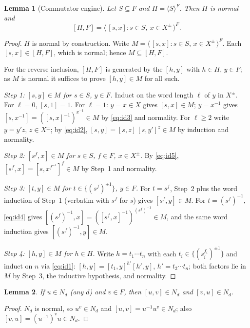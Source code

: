 \documentclass{amsart}
\newtheorem{lemma}{Lemma}
\theoremstyle{definition}
\theoremstyle{remark}
\begin{document}
\begin{lemma}[Commutator engine]\label{lem:engine}
Let $S\subseteq F$ and $H=\langle S\rangle^{F}$. Then $H$ is normal and
\begin{equation}\label{eq:engine}
[H,F]=\big\langle\,[s,x] : s\in S,\ x\in X^{\pm}\,\big\rangle^{F}.
\end{equation}
\end{lemma}
\begin{proof}
$H$ is normal by construction. Write
$M=\langle\,[s,x]:s\in S,\,x\in X^{\pm}\,\rangle^{F}$. Each $[s,x]\in[H,F]$, which is
normal; hence $M\subseteq[H,F]$.

For the reverse inclusion, $[H,F]$ is generated by the $[h,y]$ with $h\in H$,
$y\in F$; as $M$ is normal it suffices to prove $[h,y]\in M$ for all such.

\emph{Step 1: $[s,y]\in M$ for $s\in S$, $y\in F$.} Induct on the word length
$\ell$ of $y$ in $X^{\pm}$. For $\ell=0$, $[s,1]=1$. For $\ell=1$: $y=x\in X$ gives
$[s,x]\in M$; $y=x^{-1}$ gives $[s,x^{-1}]=([s,x]^{-1})^{x^{-1}}\in M$ by
\eqref{eq:id3} and normality. For $\ell\ge2$ write $y=y'z$, $z\in X^{\pm}$; by
\eqref{eq:id2}, $[s,y]=[s,z]\,[s,y']^{z}\in M$ by induction and normality.

\emph{Step 2: $[s^{f},x]\in M$ for $s\in S$, $f\in F$, $x\in X^{\pm}$.} By
\eqref{eq:id5}, $[s^{f},x]=[s,x^{f^{-1}}]^{f}\in M$ by Step~1 and normality.

\emph{Step 3: $[t,y]\in M$ for $t\in\{(s^{f})^{\pm1}\}$, $y\in F$.} For $t=s^f$,
Step~2 plus the word induction of Step~1 (verbatim with $s^f$ for $s$) gives
$[s^f,y]\in M$. For $t=(s^f)^{-1}$, \eqref{eq:id4} gives
$[(s^f)^{-1},x]=([s^f,x]^{-1})^{(s^f)^{-1}}\in M$, and the same word induction gives
$[(s^f)^{-1},y]\in M$.

\emph{Step 4: $[h,y]\in M$ for $h\in H$.} Write $h=t_1\cdots t_n$ with each
$t_i\in\{(s_i^{f_i})^{\pm1}\}$ and induct on $n$ via \eqref{eq:id1}:
$[h,y]=[t_1,y]^{h'}[h',y]$, $h'=t_2\cdots t_n$; both factors lie in $M$ by Step~3,
the inductive hypothesis, and normality.
\end{proof}

\begin{lemma}\label{lem:caseA}
If $u\in N_d$ (any $d$) and $v\in F$, then $[u,v]\in N_d$ and $[v,u]\in N_d$.
\end{lemma}
\begin{proof}
$N_d$ is normal, so $u^{v}\in N_d$ and $[u,v]=u^{-1}u^{v}\in N_d$; also
$[v,u]=(u^{-1})^{v}u\in N_d$.
\end{proof}
\end{document}
